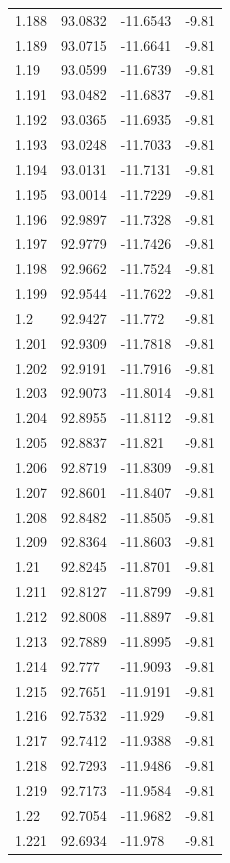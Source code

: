 \begin{tabular}{llll}
1.188 & 93.0832 & -11.6543 & -9.81 \\
1.189 & 93.0715 & -11.6641 & -9.81 \\
1.19 & 93.0599 & -11.6739 & -9.81 \\
1.191 & 93.0482 & -11.6837 & -9.81 \\
1.192 & 93.0365 & -11.6935 & -9.81 \\
1.193 & 93.0248 & -11.7033 & -9.81 \\
1.194 & 93.0131 & -11.7131 & -9.81 \\
1.195 & 93.0014 & -11.7229 & -9.81 \\
1.196 & 92.9897 & -11.7328 & -9.81 \\
1.197 & 92.9779 & -11.7426 & -9.81 \\
1.198 & 92.9662 & -11.7524 & -9.81 \\
1.199 & 92.9544 & -11.7622 & -9.81 \\
1.2 & 92.9427 & -11.772 & -9.81 \\
1.201 & 92.9309 & -11.7818 & -9.81 \\
1.202 & 92.9191 & -11.7916 & -9.81 \\
1.203 & 92.9073 & -11.8014 & -9.81 \\
1.204 & 92.8955 & -11.8112 & -9.81 \\
1.205 & 92.8837 & -11.821 & -9.81 \\
1.206 & 92.8719 & -11.8309 & -9.81 \\
1.207 & 92.8601 & -11.8407 & -9.81 \\
1.208 & 92.8482 & -11.8505 & -9.81 \\
1.209 & 92.8364 & -11.8603 & -9.81 \\
1.21 & 92.8245 & -11.8701 & -9.81 \\
1.211 & 92.8127 & -11.8799 & -9.81 \\
1.212 & 92.8008 & -11.8897 & -9.81 \\
1.213 & 92.7889 & -11.8995 & -9.81 \\
1.214 & 92.777 & -11.9093 & -9.81 \\
1.215 & 92.7651 & -11.9191 & -9.81 \\
1.216 & 92.7532 & -11.929 & -9.81 \\
1.217 & 92.7412 & -11.9388 & -9.81 \\
1.218 & 92.7293 & -11.9486 & -9.81 \\
1.219 & 92.7173 & -11.9584 & -9.81 \\
1.22 & 92.7054 & -11.9682 & -9.81 \\
1.221 & 92.6934 & -11.978 & -9.81 \\

\end{tabular}
